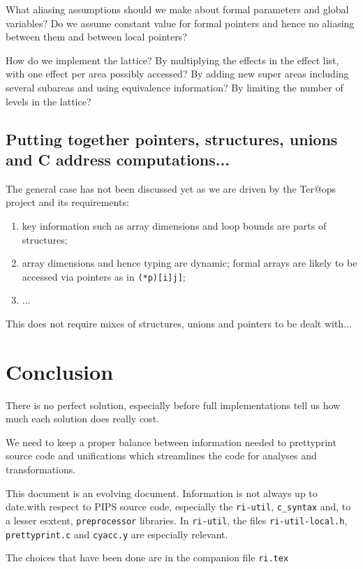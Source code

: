 \documentclass[a4paper]{report}
\begin{document}
What aliasing assumptions should we make about formal parameters and
 global variables? Do we assume constant value for formal pointers and
 hence no aliasing between them and between local pointers?

How do we implement the lattice? By multiplying the effects in the
 effect list, with one effect per area possibly accessed? By adding
 new super areas including several subareas and using equivalence
 information? By limiting the number of levels in the lattice?

\section{Putting together pointers, structures, unions and C address computations...}

The general case has not been discussed yet as we are driven by the
 Ter@ops project and its requirements:
\begin{enumerate}
\item key information such as array dimensions and loop bounds are
 parts of structures;
\item array dimensions and hence typing are dynamic; formal arrays are
 likely to be accessed via pointers as in \verb/(*p)[i]j]/;
\item ...
\end{enumerate}

This does not require mixes of structures, unions and pointers to be
 dealt with...

\chapter*{Conclusion}

There is no perfect solution, especially before full implementations
tell us how much each solution does really cost.

We need to keep a proper balance between information needed to
prettyprint source code and unifications which streamlines the code
for analyses and transformations.

This document is an evolving document. Information is not always up to
date.with respect to PIPS source code, especially the \verb/ri-util/,
\verb/c_syntax/ and, to a lesser esxtent, \verb/preprocessor/
libraries. In \verb/ri-util/, the files \verb/ri-util-local.h/,
\verb/prettyprint.c/ and \verb/cyacc.y/ are especially relevant.

\nocite{Kern78, Necu02}

The choices that have been done are in the companion file \texttt{ri.tex}
\end{document}
